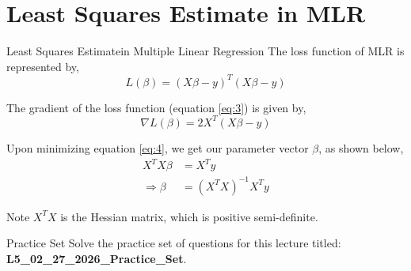 \documentclass{beamer}
\begin{document}
    \section{Least Squares Estimate in MLR}
    \begin{frame}{Least Squares Estimate}{in Multiple Linear Regression}
        The loss function of MLR is represented by,
            \begin{equation}\label{eq:3}
                L(\beta)=(X\beta-y)^T(X\beta-y)
            \end{equation}

        The gradient of the loss function (equation \eqref{eq:3}) is given by,
        \begin{equation}\label{eq:4}
            \nabla L(\beta)=2X^T(X\beta-y)
        \end{equation}

        Upon minimizing equation \eqref{eq:4}, we get our parameter vector \(\beta\), as shown below,
        \begin{align}
            X^TX\beta&=X^Ty\nonumber\\
            \Rightarrow \beta&=(X^TX)^{-1}X^Ty
        \end{align}

        \begin{block}{Note}
            \(X^TX\) is the Hessian matrix, which is positive semi-definite.
        \end{block}
    \end{frame}

    \begin{frame}
        \begin{alertblock}{Practice Set}
            Solve the practice set of questions for this lecture titled: \textbf{L5\_02\_27\_2026\_Practice\_Set}.
        \end{alertblock}
    \end{frame}
\end{document}
